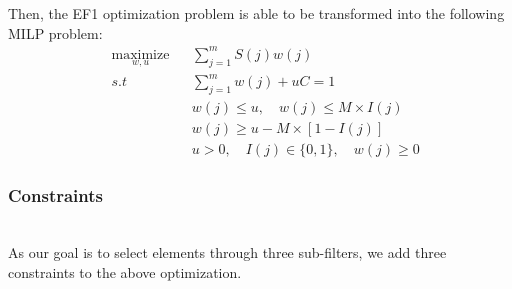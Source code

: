 Then, the EF1 optimization problem is able to be transformed into the following MILP problem:
\begin{equation}
\begin{aligned}
& \underset{w,u}{\text{maximize}}
& & \sum_{j=1}^m S(j)w(j) \\
& s.t
& & \sum_{j=1}^m w(j) + uC = 1 \\
& & & w(j) \leqslant u, \quad w(j) \leqslant M\times I(j)  \\
& & & w(j) \geqslant u - M\times [1-I(j)] \\
& & & u > 0,  \quad I(j) \in \{0, 1\}, \quad w(j) \geqslant 0 \label{eq:milp}
\end{aligned}
\end{equation}

\subsubsection{Constraints} \hfill \\
As our goal is to select elements through three sub-filters, we add three constraints to the above optimization.
